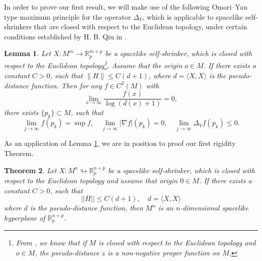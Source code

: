 \documentclass[leqno,11pt]{amsart}
\theoremstyle{plain}
\newtheorem{theorem}{\indent\sc Theorem}[section]
\newtheorem{lemma}[theorem]{\indent\sc Lemma}
\theoremstyle{definition}
\numberwithin{equation}{section}
\begin{document}
In order to prove our first result, we will make use of the following Omori--Yau type maximum principle for the operator $\Delta_V$, which is applicable to spacelike self-shrinkers that are closed with respect to the Euclidean topology, under certain conditions established by H. B. Qiu in \cite{Qiu:2021}.


\begin{lemma}\label{lemaDelta_V}
	Let $X \colon M^m \to \mathbb{R}^{m+p}_p$ be a spacelike self-shrinker, which is closed with respect to the Euclidean topology\footnote{From \cite{JostXin2001}, we know that if $M$ is closed with respect to the Euclidean topology and $o \in M$, the pseudo-distance $z$ is a non-negative proper function on $M$.}. Assume that the origin $o \in M$. If there exists a constant $C > 0$, such that $\|H\| \leq C(d + 1)$, where $d = \langle X, X \rangle$ is the pseudo-distance function. Then for any $f \in C^2(M)$ with 
	$$
	\lim_{x\to\infty} \frac{f(x)}{\log(d(x)+1)} = 0,
	$$
	there exists $\{p_k\} \subset M$, such that
	$$
	\lim_{j\to\infty} f(p_k) = \sup f, \quad 
	\lim_{j\to\infty} |\nabla f|(p_k) = 0, \quad 
	\lim_{j\to\infty} \Delta_V f(p_k) \leq 0.
	$$
\end{lemma}

As an application of Lemma \ref{lemaDelta_V}, we are in position to proof our first rigidity Theorem.

\begin{theorem}\label{TH1}
Let $X:M^n\looparrowright\mathbb R^{n+p}_{p}$ be a spacelike self-shrinker, which is closed with respect to the Euclidean topology and assume that origin $0 \in M$. If there exists a constant $C>0$, such that 
$$||H||\leq C(d+1), \quad  d = \langle X, X \rangle$$ 
where $d$ is the pseudo-distance function, then $M^n$ is an $n$-dimensional spacelike hyperplane of $\mathbb R^{n+p}_{p}$.
\end{theorem}
\end{document}
